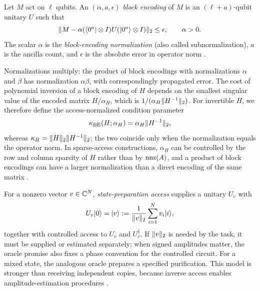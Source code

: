 \begin{definition}
\label{def:block-encoding}
Let $M$ act on $\ell$ qubits.  An $(\alpha,a,\epsilon)$ \emph{block encoding} of
$M$ is an $(\ell+a)$-qubit unitary $U$ such that
\begin{equation}
 \lVert M-\alpha(\langle 0^a\rvert\otimes I)U(\lvert 0^a\rangle\otimes I)\rVert_2\leq\epsilon,
 \qquad \alpha>0.
 \label{eq:block-encoding}
\end{equation}
The scalar $\alpha$ is the \emph{block-encoding normalization} (also called
subnormalization), $a$ is the ancilla count, and $\epsilon$ is the absolute
error in operator norm \cite{andras2019-quantum-singular-value-transformation-beyond}.
\end{definition}

Normalizations multiply: the product of block encodings with normalizations
$\alpha$ and $\beta$ has normalization $\alpha\beta$, with correspondingly
propagated error.  The cost of polynomial inversion of a block encoding of $H$
depends on the smallest singular value of the encoded matrix $H/\alpha_H$,
which is $1/(\alpha_H\lVert H^{-1}\rVert_2)$.  For invertible $H$, we therefore
define the access-normalized condition parameter
\begin{equation}
 \kappa_{\rm BE}(H;\alpha_H)=\alpha_H\lVert H^{-1}\rVert_2,
 \label{eq:kappa-be}
\end{equation}
whereas $\kappa_H=\lVert H\rVert_2\lVert H^{-1}\rVert_2$; the two coincide only when the
normalization equals the operator norm.  In sparse-access constructions,
$\alpha_H$ can be controlled by the row and column sparsity of $H$ rather than
by $\operatorname{nnz}(A)$, and a product of block encodings can have a larger
normalization than a direct encoding of the same matrix
\cite{andras2019-quantum-singular-value-transformation-beyond}.

\begin{definition}
\label{def:state-preparation-access}
For a nonzero vector $v\in\mathbb{C}^N$, \emph{state-preparation access} supplies a
unitary $U_v$ with
\begin{equation}
 U_v\lvert 0\rangle=\lvert v\rangle:=\frac{1}{\lVert v\rVert_2}\sum_{i=1}^N v_i\lvert i\rangle,
 \label{eq:state-prep}
\end{equation}
together with controlled access to $U_v$ and $U_v^\dagger$.  If
$\lVert v\rVert_2$ is needed by the task, it must be supplied or estimated
separately; when signed amplitudes matter, the oracle promise also fixes a
phase convention for the controlled circuit.  For a mixed state, the
analogous oracle prepares a specified purification.  This model is stronger
than receiving independent copies, because inverse access enables
amplitude-estimation procedures
\cite{joran2023-quantum-tomography-state-preparation-unitaries}.
\end{definition}

